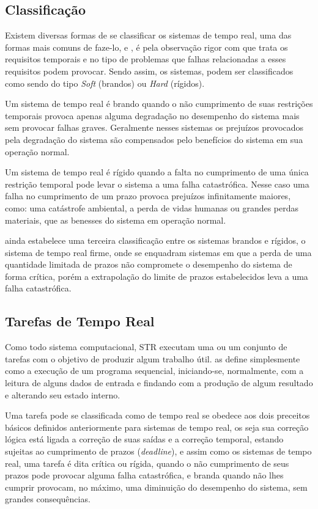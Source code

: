\subsection{Classificação}
Existem diversas formas de se classificar os sistemas de tempo real, uma das formas mais comuns de faze-lo,  \cite{Farines2000} e \cite{Laplante2012}, é pela observação rigor com que trata os requisitos temporais e no tipo de problemas que falhas relacionadas a esses requisitos podem provocar. Sendo assim, os sistemas, podem ser classificados como sendo do tipo \textit{Soft} (brandos) ou \textit{Hard} (rígidos). 

Um sistema de tempo real é brando quando o não cumprimento de suas restrições temporais provoca apenas alguma degradação no desempenho do sistema mais sem provocar falhas graves. Geralmente nesses sistemas os prejuízos provocados pela degradação do sistema são compensados pelo benefícios do sistema em sua operação normal.

Um sistema de tempo real é rígido quando a falta no cumprimento de uma única restrição temporal pode levar o sistema a uma falha catastrófica. Nesse caso uma falha no cumprimento de um prazo provoca prejuízos infinitamente maiores, como: uma catástrofe ambiental, a perda de vidas humanas ou grandes perdas materiais, que as benesses do sistema em operação normal.

\cite{Laplante2012} ainda estabelece uma terceira classificação entre os sistemas brandos e rígidos, o sistema de tempo real firme, onde se enquadram sistemas em que a perda de uma quantidade limitada de prazos não compromete o desempenho do sistema de forma crítica, porém a extrapolação do limite de prazos estabelecidos leva a uma falha catastrófica.

\subsection{Tarefas de Tempo Real}
Como todo sistema computacional, STR executam uma ou um conjunto de tarefas com o objetivo de produzir algum trabalho útil. \cite{Kopetz} as define simplesmente como a execução de um programa sequencial, iniciando-se, normalmente, com a leitura de alguns dados de entrada e findando com a produção de algum resultado e alterando seu estado interno. 

Uma tarefa pode se classificada como de tempo real se obedece aos dois preceitos básicos definidos anteriormente para sistemas de tempo real, os seja sua correção lógica está ligada a correção de suas saídas e a correção temporal, estando sujeitas ao cumprimento de prazos (\textit{deadline}), e assim como os sistemas de tempo real, uma tarefa é dita crítica ou rígida, quando o não cumprimento de seus prazos pode provocar alguma falha catastrófica, e branda quando não lhes cumprir provocam, no máximo, uma diminuição do desempenho do sistema, sem grandes consequências.

